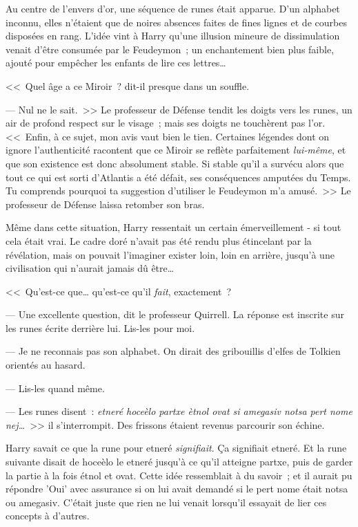 Au centre de l'envers d'or, une séquence de runes était apparue. D'un alphabet inconnu, elles n'étaient que de noires absences faites de fines lignes et de courbes disposées en rang. L'idée vint à Harry qu'une illusion mineure de dissimulation venait d'être consumée par le Feudeymon~; un enchantement bien plus faible, ajouté pour empêcher les enfants de lire ces lettres…

<<~Quel âge a ce Miroir~? dit-il presque dans un souffle.

--- Nul ne le sait.~>> Le professeur de Défense tendit les doigts vers les runes, un air de profond respect sur le visage~; mais ses doigts ne touchèrent pas l'or. <<~Enfin, à ce sujet, mon avis vaut bien le tien. Certaines légendes dont on ignore l'authenticité racontent que ce Miroir se reflète parfaitement \emph{lui-même}, et que son existence est donc absolument stable. Si stable qu'il a survécu alors que tout ce qui est sorti d'Atlantis a été défait, ses conséquences amputées du Temps. Tu comprends pourquoi ta suggestion d'utiliser le Feudeymon m'a amusé.~>> Le professeur de Défense laissa retomber son bras.

Même dans cette situation, Harry ressentait un certain émerveillement - si tout cela était vrai. Le cadre doré n'avait pas été rendu plus étincelant par la révélation, mais on pouvait l'imaginer exister loin, loin en arrière, jusqu'à une civilisation qui n'aurait jamais dû être…

<<~Qu'est-ce que… qu'est-ce qu'il \emph{fait}, exactement~?

--- Une excellente question, dit le professeur Quirrell. La réponse est inscrite sur les runes écrite derrière lui. Lis-les pour moi.

--- Je ne reconnais pas son alphabet. On dirait des gribouillis d'elfes de Tolkien orientés au hasard.

--- Lis-les quand même. 

--- Les runes disent~: \emph{etneré hoceèlo partxe ètnol ovat si amegasiv notsa pert nome nej…}~>> il s'interrompit. Des frissons étaient revenus parcourir son échine.

Harry savait ce que la rune pour etneré \emph{signifiait}. Ça signifiait etneré. Et la rune suivante disait de hoceèlo le etneré jusqu'à ce qu'il atteigne partxe, puis de garder la partie à la fois étnol et ovat. Cette idée ressemblait à du savoir~; et il aurait pu répondre 'Oui' avec assurance si on lui avait demandé si le pert nome était notsa ou amegasiv. C'était juste que rien ne lui venait lorsqu'il essayait de lier ces concepts à d'autres.

